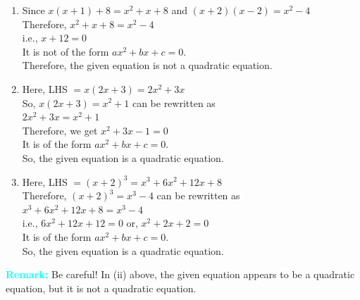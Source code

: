 \documentclass[a4paper,12pt]{article}
\begin{document}
\fancyhead[R]{\textcolor{MidnightBlue}{K SATHVIKA \\ COMET.FWC20}}   
\setlength{\headheight}{4cm}
\setlength{\headsep}{15pt}
\begin{enumerate}[label=(\roman*),start=2]
    \item \noindent Since \(x(x+1) + 8 = x^2 + x + 8\) and \((x + 2)(x - 2) = x^2 - 4\) \\
Therefore, \hspace*{3em} \(x^2 + x + 8 = x^2 - 4\) \\
i.e., 
\hspace*{7em} \(x + 12 = 0\) \\
It is not of the form \(ax^2 + bx + c = 0\). \\
Therefore, the given equation is not a quadratic equation.
\vspace{-0.7em}
\item \noindent Here,
\hspace*{1.5em} LHS \(= x(2x + 3) = 2x^2 + 3x\) \\
So, \hspace*{5em} \(x(2x + 3) = x^2 + 1\) can be rewritten as \\
\hspace*{7em} \(2x^2 + 3x = x^2 + 1\) \\
Therefore, we get \hspace{1em} \(x^2 + 3x - 1 = 0\) \\
It is of the form \(ax^2 + bx + c = 0\). \\
 So, the given equation is a quadratic equation.
 \vspace{-0.7em}
\item \noindent Here, 
\hspace*{1.5em} LHS \(= (x+2)^3 = x^3 + 6x^2 + 12x + 8\) \\
Therefore, 
\hspace*{3em} \((x+2)^3 = x^3 - 4\) can be rewritten as \\
\hspace*{6em} \(x^3 + 6x^2 + 12x + 8 = x^3 - 4\) \\
i.e., \hspace*{4em} \(6x^2 + 12x + 12 = 0\) \quad  or, \quad \(x^2 + 2x + 2 = 0\) \\
It is of the form \(ax^2 + bx + c = 0\). \\
So, the given equation is a quadratic equation.
\end{enumerate}
\vspace{-0.7em}
\noindent \textcolor{cyan}{\textbf{Remark:}} Be careful! In (ii) above, the given equation appears to be a quadratic equation, but it is not a quadratic equation.
\end{document}
